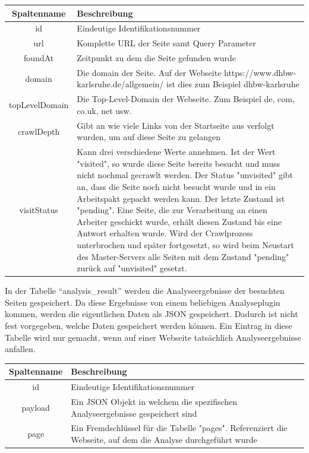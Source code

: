 \begin{tabular}{c|p{10cm}}
	Spaltenname & Beschreibung  \\ 
	\hline\hline
	id & Eindeutige Identifikationsnummer \\ 
	\hline 
	url & Komplette URL der Seite samt Query Parameter \\
	\hline 
	foundAt & Zeitpunkt zu dem die Seite gefunden wurde \\
	\hline 
	domain & Die domain der Seite. Auf der Webseite https://www.dhbw-karlsruhe.de/allgemein/ ist dies zum Beispiel dhbw-karlsruhe \\
	\hline 
	topLevelDomain & Die Top-Level-Domain der Webseite. Zum Beispiel de, com, co.uk, net usw.  \\
	\hline 
	crawlDepth & Gibt an wie viele Links von der Startseite aus verfolgt wurden, um auf diese Seite zu gelangen \\
	\hline 
	visitStatus & Kann drei verschiedene Werte annehmen. Ist der Wert "visited", so wurde diese Seite bereits besucht und muss nicht nochmal gecrawlt werden. Der Status "unvisited" gibt an, dass die Seite noch nicht besucht wurde und in ein Arbeitspakt gepackt werden kann. Der letzte Zustand ist "pending". Eine Seite, die zur Verarbeitung an einen Arbeiter geschickt wurde, erhält diesen Zustand bis eine Antwort erhalten wurde. Wird der Crawlprozess unterbrochen und später fortgesetzt, so wird beim Neustart des Master-Servers alle Seiten mit dem Zustand "pending" zurück auf "unvisited" gesetzt. \\
\end{tabular} 


In der Tabelle "`analysis\_result"' werden die Analyseergebnisse der besuchten Seiten gespeichert. Da diese Ergebnisse von einem beliebigen Analyseplugin kommen, werden die eigentlichen Daten als JSON gespeichert. Dadurch ist nicht fest vorgegeben, welche Daten gespeichert werden können. Ein Eintrag in diese Tabelle wird nur gemacht, wenn auf einer Webseite tatsächlich Analyseergebnisse anfallen.

\begin{tabular}{c|p{10.5cm}}
	Spaltenname & Beschreibung  \\ 
	\hline\hline
	id & Eindeutige Identifikationsnummer \\ 
	\hline 
	payload & Ein JSON Objekt in welchem die spezifischen Analyseergebnisse gespeichert sind \\
	\hline 
	page & Ein Fremdschlüssel für die Tabelle "pages". Referenziert die Webseite, auf dem die Analyse durchgeführt wurde  \\
\end{tabular} 

